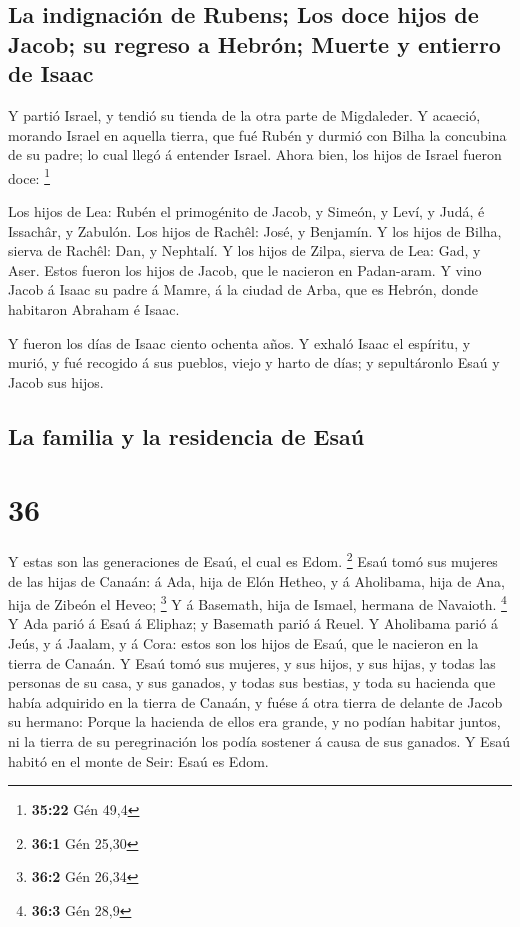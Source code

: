 \hypertarget{la-indignaciuxf3n-de-rubens-los-doce-hijos-de-jacob-su-regreso-a-hebruxf3n-muerte-y-entierro-de-isaac}{%
\subsection{La indignación de Rubens; Los doce hijos de Jacob; su
regreso a Hebrón; Muerte y entierro de
Isaac}\label{la-indignaciuxf3n-de-rubens-los-doce-hijos-de-jacob-su-regreso-a-hebruxf3n-muerte-y-entierro-de-isaac}}

 Y partió Israel, y tendió su tienda de la otra parte de
Migdaleder.  Y acaeció, morando Israel en aquella tierra,
que fué Rubén y durmió con Bilha la concubina de su padre; lo cual llegó
á entender Israel. Ahora bien, los hijos de Israel fueron doce:
\footnote{\textbf{35:22} Gén 49,4}

 Los hijos de Lea: Rubén el primogénito de Jacob, y
Simeón, y Leví, y Judá, é Issachâr, y Zabulón.  Los hijos
de Rachêl: José, y Benjamín.  Y los hijos de Bilha,
sierva de Rachêl: Dan, y Nephtalí.  Y los hijos de Zilpa,
sierva de Lea: Gad, y Aser. Estos fueron los hijos de Jacob, que le
nacieron en Padan-aram.  Y vino Jacob á Isaac su padre á
Mamre, á la ciudad de Arba, que es Hebrón, donde habitaron Abraham é
Isaac.

 Y fueron los días de Isaac ciento ochenta años.
 Y exhaló Isaac el espíritu, y murió, y fué recogido á
sus pueblos, viejo y harto de días; y sepultáronlo Esaú y Jacob sus
hijos.

\hypertarget{la-familia-y-la-residencia-de-esauxfa}{%
\subsection{La familia y la residencia de
Esaú}\label{la-familia-y-la-residencia-de-esauxfa}}

\hypertarget{section-35}{%
\section{36}\label{section-35}}

 Y estas son las generaciones de Esaú, el cual es Edom.
\footnote{\textbf{36:1} Gén 25,30}  Esaú tomó sus mujeres
de las hijas de Canaán: á Ada, hija de Elón Hetheo, y á Aholibama, hija
de Ana, hija de Zibeón el Heveo; \footnote{\textbf{36:2} Gén 26,34}
 Y á Basemath, hija de Ismael, hermana de Navaioth.
\footnote{\textbf{36:3} Gén 28,9}  Y Ada parió á Esaú á
Eliphaz; y Basemath parió á Reuel.  Y Aholibama parió á
Jeús, y á Jaalam, y á Cora: estos son los hijos de Esaú, que le nacieron
en la tierra de Canaán.  Y Esaú tomó sus mujeres, y sus
hijos, y sus hijas, y todas las personas de su casa, y sus ganados, y
todas sus bestias, y toda su hacienda que había adquirido en la tierra
de Canaán, y fuése á otra tierra de delante de Jacob su hermano:
 Porque la hacienda de ellos era grande, y no podían
habitar juntos, ni la tierra de su peregrinación los podía sostener á
causa de sus ganados.  Y Esaú habitó en el monte de Seir:
Esaú es Edom.

